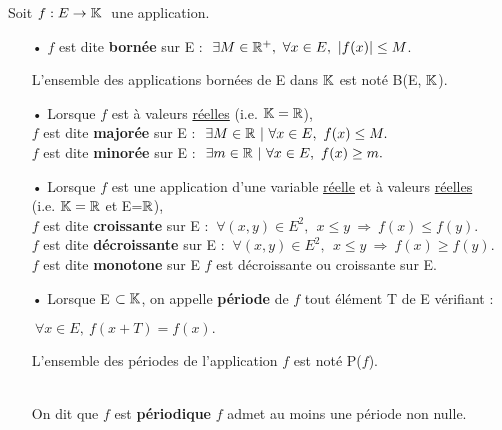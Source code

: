 \noindent Soit \(f : E\to \mathbb{K}\ \) une application.
\vspace{-0.2cm}
\begin{itemize}
    \item[•] \(f\) est dite \textbf{bornée} sur E \ssi : \(\ \exists M\in \RR ^+, \ \forall x\in E, \ |f(x)|\leq M\). \\
    \begin{small}L'ensemble des applications bornées de E dans \(\mathbb{K}\) est noté B(E,\(\ \mathbb{K}\)).\end{small}\vspace{0.3cm}
    
    \item[•] Lorsque \(f\) est à valeurs \underline{réelles} (i.e. \(\mathbb{K}=\mathbb{R}\)), \\
    \(f\) est dite \textbf{majorée} sur E \ssi : \(\ \exists M\in \RR \ | \ \forall x \in E,\ f(x)\leq M.\) \\
    \(f\) est dite \textbf{minorée} sur E \ssi : \(\ \exists m\in \RR \ | \ \forall x \in E,\ f(x)\geq m.\)\vspace{0.3cm}
     
    \item[•] Lorsque \(f\) est une application d'une variable \underline{réelle} et à valeurs \underline{réelles} \\
    (i.e. \(\mathbb{K}=\mathbb{R}\) et E=\(\mathbb{R}\)), \\
    \(f\) est dite \textbf{croissante} sur E \ssi : \(\ \forall (x,y)\in E^2,\ \ x\leq y\ \Rightarrow \ f(x)\leq f(y).\) \\
    \(f\) est dite \textbf{décroissante} sur E \ssi : \(\ \forall (x,y)\in E^2,\ \ x\leq y\ \Rightarrow \ f(x)\geq f(y).\) \\
    \(f\) est dite \textbf{monotone} sur E \ssi \(f\) est décroissante ou croissante sur E.\vspace{0.3cm}
    
    \item[•] Lorsque E\(\ \subset \mathbb{K}\), on appelle \textbf{période} de \(f\) tout élément T de E vérifiant :\vspace{-0.3cm}
    \begin{center}\(\ \forall x\in E,\ f(x+T)=f(x).\)\end{center}\vspace{-0.3cm}
    \begin{small}L'ensemble des périodes de l'application \(f\) est noté P(\(f\)).\end{small} \\
    On dit que \(f\) est \textbf{périodique} \ssi \(f\) admet au moins une période non nulle.\vspace{0.3cm}


\end{itemize}
